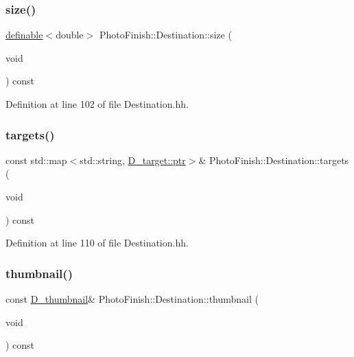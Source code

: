 \subsubsection{\texorpdfstring{size()}{size()}}
{\footnotesize\ttfamily \hyperlink{class_photo_finish_1_1definable}{definable}$<$double$>$ Photo\+Finish\+::\+Destination\+::size (\begin{DoxyParamCaption}\item[{void}]{ }\end{DoxyParamCaption}) const\hspace{0.3cm}{\ttfamily [inline]}}



Definition at line 102 of file Destination.\+hh.

\mbox{\label{class_photo_finish_1_1_destination_a4c0d0bd1588471d13e0ab067ab129f7b}} 
\subsubsection{\texorpdfstring{targets()}{targets()}}
{\footnotesize\ttfamily const std\+::map$<$std\+::string, \hyperlink{class_photo_finish_1_1_d__target_a44befb9c758d25b0c765e97caa1caa39}{D\+\_\+target\+::ptr}$>$\& Photo\+Finish\+::\+Destination\+::targets (\begin{DoxyParamCaption}\item[{void}]{ }\end{DoxyParamCaption}) const\hspace{0.3cm}{\ttfamily [inline]}}



Definition at line 110 of file Destination.\+hh.

\mbox{\label{class_photo_finish_1_1_destination_a085dbe26aade0eda5d6a889162ed7880}} 
\subsubsection{\texorpdfstring{thumbnail()}{thumbnail()}}
{\footnotesize\ttfamily const \hyperlink{class_photo_finish_1_1_d__thumbnail}{D\+\_\+thumbnail}\& Photo\+Finish\+::\+Destination\+::thumbnail (\begin{DoxyParamCaption}\item[{void}]{ }\end{DoxyParamCaption}) const\hspace{0.3cm}{\ttfamily [inline]}}



